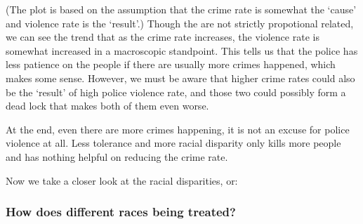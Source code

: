 \documentclass[11pt]{article}
\begin{document}
    
    
    (The plot is based on the assumption that the crime rate is somewhat the
`cause' and violence rate is the `result'.) Though the are not strictly
propotional related, we can see the trend that as the crime rate
increases, the violence rate is somewhat increased in a macroscopic
standpoint. This tells us that the police has less patience on the
people if there are usually more crimes happened, which makes some
sense. However, we must be aware that higher crime rates could also be
the `result' of high police violence rate, and those two could possibly
form a dead lock that makes both of them even worse.

At the end, even there are more crimes happening, it is not an excuse
for police violence at all. Less tolerance and more racial disparity
only kills more people and has nothing helpful on reducing the crime
rate.

    Now we take a closer look at the racial disparities, or:

\hypertarget{how-does-different-races-being-treated}{%
\subsubsection{How does different races being
treated?}\label{how-does-different-races-being-treated}}
\end{document}
